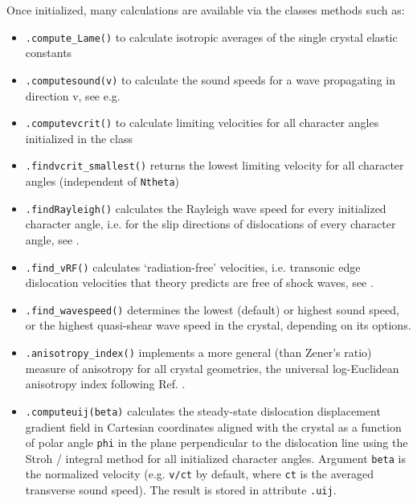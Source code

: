 \documentclass[11pt,letterpaper,oneside]{article}
\begin{document}
Once initialized, many calculations are available via the classes methods such as:
\begin{itemize}
\item \verb|.compute_Lame()| to calculate isotropic averages of the single crystal elastic constants

\item \verb|.computesound(v)| to calculate the sound speeds for a wave propagating in direction v, see e.g. \cite{Fitzgerald:1967}

\item \verb|.computevcrit()| to calculate limiting velocities for all character angles initialized in the class

\item \verb|.findvcrit_smallest()| returns the lowest limiting velocity for all character angles (independent of \verb|Ntheta|)

\item \verb|.findRayleigh()| calculates the Rayleigh wave speed for every initialized character angle, i.e. for the slip directions of dislocations of every character angle, see \cite{Barnett:1973b}.

\item \verb|.find_vRF()| calculates `radiation-free' velocities, i.e. transonic edge dislocation velocities that theory predicts are free of shock waves, see \cite{Gao:1999,Blaschke:2023rad}.

\item \verb|.find_wavespeed()| determines the lowest (default) or highest sound speed, or the highest quasi-shear wave speed in the crystal, depending on its options.

\item \verb|.anisotropy_index()| implements a more general (than Zener's ratio) measure of anisotropy for all crystal geometries, the universal log-Euclidean anisotropy index following Ref. \cite{Kube:2016anis}.

\item \verb|.computeuij(beta)| calculates the steady-state dislocation displacement gradient field in Cartesian coordinates aligned with the crystal as a function of polar angle \verb|phi| in the plane perpendicular to the dislocation line using the Stroh / integral method \cite{Bacon:1980} for all initialized character angles.
Argument \verb|beta| is the normalized velocity (e.g. \verb|v/ct| by default, where \verb|ct| is the averaged transverse sound speed).
The result is stored in attribute \verb|.uij|.


\end{itemize}
\end{document}
